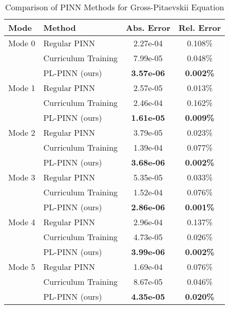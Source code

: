 \begin{table}[htbp]
\centering
\caption{Comparison of PINN Methods for Gross-Pitaevskii Equation}
\label{tab:pinn_comparison}
\begin{tabular}{llcc}
\toprule
Mode & Method & Abs. Error & Rel. Error \\
\midrule
Mode 0 & Regular PINN & 2.27e-04 & 0.108\% \\
 & Curriculum Training & 7.99e-05 & 0.048\% \\
 & PL-PINN (ours) & \textbf{3.57e-06} & \textbf{0.002\%} \\
\midrule
Mode 1 & Regular PINN & 2.57e-05 & 0.013\% \\
 & Curriculum Training & 2.46e-04 & 0.162\% \\
 & PL-PINN (ours) & \textbf{1.61e-05} & \textbf{0.009\%} \\
\midrule
Mode 2 & Regular PINN & 3.79e-05 & 0.023\% \\
 & Curriculum Training & 1.39e-04 & 0.077\% \\
 & PL-PINN (ours) & \textbf{3.68e-06} & \textbf{0.002\%} \\
\midrule
Mode 3 & Regular PINN & 5.35e-05 & 0.033\% \\
 & Curriculum Training & 1.52e-04 & 0.076\% \\
 & PL-PINN (ours) & \textbf{2.86e-06} & \textbf{0.001\%} \\
\midrule
Mode 4 & Regular PINN & 2.96e-04 & 0.137\% \\
 & Curriculum Training & 4.73e-05 & 0.026\% \\
 & PL-PINN (ours) & \textbf{3.99e-06} & \textbf{0.002\%} \\
\midrule
Mode 5 & Regular PINN & 1.69e-04 & 0.076\% \\
 & Curriculum Training & 8.67e-05 & 0.046\% \\
 & PL-PINN (ours) & \textbf{4.35e-05} & \textbf{0.020\%} \\
\bottomrule
\end{tabular}
\end{table}